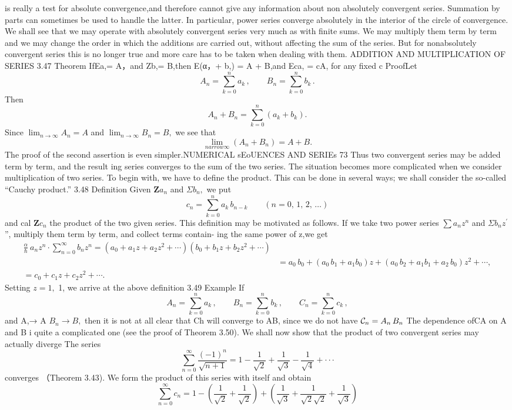is really a test for absolute convergence,and therefore cannot give any information about non absolutely convergent series. Summation by parts can sometimes be used to handle the latter. In particular, power series converge absolutely in the interior of the circle of convergence. We shall see that we may operate with absolutely convergent series very much as with finite sums. We may multiply them term by term and we may change the order in which the additions are carried out, without affecting the sum of the series. But for nonabsolutely convergent series this is no longer true and more care has to be taken when dealing with them. ADDITION AND MULTIPLICATION OF SERIES 3.47 Theorem IfEa,= A，and Zb,= B,then E(α，+ b,) = A + B,and Eca, = cA, for any fixed c ProofLet $$ A_{n}=\sum_{k=0}^{n}a_{k}\,,\qquad B_{n}=\sum_{k=0}^{n}b_{k}\,. $$ Then $$ A_{n}+B_{n}=\sum_{k=0}^{n}(a_{k}+b_{k}). $$ Since $\operatorname*{lim}_{n\to\infty}A_{n}=A$ and $\operatorname*{lim}_{n\to\infty}B_{n}=B,$ we see that $$ \operatorname*{lim}_{n arrow\infty}(A_{n}+B_{n})=A+B. $$ The proof of the second assertion is even simpler.NUMERICAL sEoUENCES AND SERIEs 73 Thus two convergent series may be added term by term, and the result ing series converges to the sum of the two series. The situation becomes more complicated when we consider multiplication of two series. To begin with, we have to define the product. This can be done in several ways; we shall consider the so-called “Cauchy product.” 3.48 Definition Given $\textstyle\mathbf{Z}a_{n}$ and $\Sigma b_{n},$ we put $$ c_{n}=\sum_{k=0}^{n}a_{k}\,b_{n-k}\qquad(n=0,\,1,\,2,\,\dots) $$ and cal $\textstyle\mathbf{Z}c_{n}$ the product of the two given series. This definition may be motivated as follows. If we take two power series $\scriptstyle{{\sum}a_{n}z^{n}}$ and $\Sigma b_{n}z^{\prime}$ ”, multiply them term by term, and collect terms contain- ing the same power of z,we get $$ \begin{array}{l}{{\frac{\alpha}{\hbar}\ a_{n}z^{n}\cdot\sum_{n=0}^{\infty}b_{n}z^{n}=(a_{0}+a_{1}z+a_{2}z^{2}+\cdots)(b_{0}+b_{1}z+b_{2}z^{2}+\cdots)}}\\ {{\ }}&{{=a_{0}\,b_{0}+(a_{0}\,b_{1}+a_{1}b_{0})z+(a_{0}\,b_{2}+a_{1}b_{1}+a_{2}\,b_{0})z^{2}+\cdots,}}\\ {{=c_{0}+c_{1}z+c_{2}z^{2}+\cdots.}}\end{array} $$ Setting $z=1,$ 1, we arrive at the above definition 3.49 Example If $$ A_{n}=\sum_{k=0}^{n}a_{k}\,,\qquad B_{n}=\sum_{k=0}^{n}b_{k}\,,\qquad C_{n}=\sum_{k=0}^{n}c_{k}\,, $$ and A,→ A $B_{n}\to B,$ then it is not at all clear that {Ch} will converge to AB, since we do not have ${\cal C}_{n}=A_{n}\,B_{n}$ The dependence of{CA} on {A} and {B} i quite a complicated one (see the proof of Theorem 3.50). We shall now show that the product of two convergent series may actually diverge The series $$ \sum_{n=0}^{\infty}{\frac{(-1)^{n}}{\sqrt{n+1}}}=1-{\frac{1}{\sqrt{2}}}+{\frac{1}{\sqrt{3}}}-{\frac{1}{\sqrt{4}}}+\cdot\cdot\cdot $$ converges （Theorem 3.43). We form the product of this series with itself and obtain $$ \sum_{n=0}^{\infty}c_{n}=1-\left(\frac{1}{\sqrt{2}}+\frac{1}{\sqrt{2}}\right)+\left(\frac{1}{\sqrt{3}}+\frac{1}{\sqrt{2}\sqrt{2}}+\frac{1}{\sqrt{3}}\right) $$ $$ 